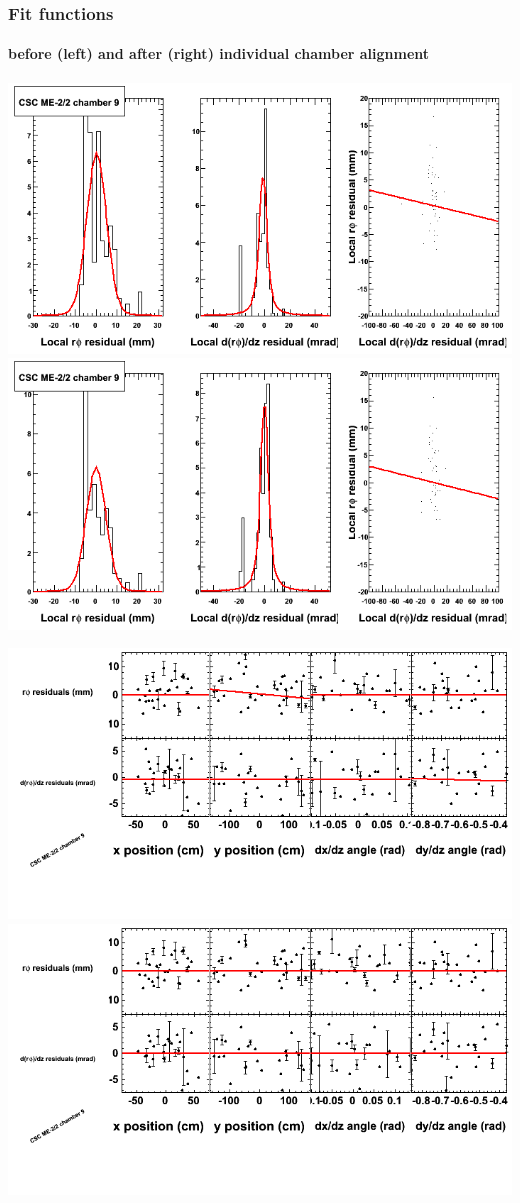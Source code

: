 \documentclass[compress]{beamer}
\begin{document}
\begin{frame}
\frametitle{Fit functions}
\framesubtitle{before (left) and after (right) individual chamber alignment}
\includegraphics[width=0.5\linewidth]{ringfits_3dof/beforefit_MEm22_09_bellcurve.png} \includegraphics[width=0.5\linewidth]{ringfits_3dof/afterfit_MEm22_09_bellcurve.png}

\includegraphics[width=0.5\linewidth]{ringfits_3dof/beforefit_MEm22_09_polynomials.png} \includegraphics[width=0.5\linewidth]{ringfits_3dof/afterfit_MEm22_09_polynomials.png}
\end{frame}
\end{document}
